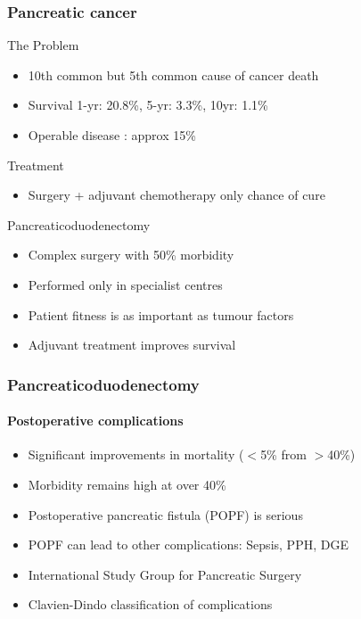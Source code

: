 \documentclass[10pt]{beamer}
\begin{document}
\begin{frame}
	\frametitle{Pancreatic cancer} %
	\begin{block}{The Problem}
		\begin{itemize}
			\item 10th common but 5th common cause of cancer death
			\item Survival	1-yr: 20.8\%, 5-yr: 3.3\%, 10yr: 1.1\%
			\item Operable disease : approx 15\%
		\end{itemize}
	\end{block}
	\begin{block}{Treatment}
		\begin{itemize}
			\item Surgery + adjuvant chemotherapy only chance of cure
		\end{itemize}
	\end{block}
	\begin{block}{Pancreaticoduodenectomy}
		\begin{itemize}
			\item Complex surgery with 50\% morbidity
			\item Performed only in specialist centres
			\item Patient fitness is as important as tumour factors
			\item Adjuvant treatment improves survival
		\end{itemize}
	\end{block}
\end{frame}

\begin{frame}
	\frametitle{Pancreaticoduodenectomy}
	\framesubtitle{Postoperative complications}
	\begin{itemize}
		\item Significant improvements in mortality ($<$5\% from $>$40\%)
		\item Morbidity remains high at over 40\%
		\item Postoperative pancreatic fistula (POPF) is serious
		\item POPF can lead to other complications: Sepsis, PPH, DGE
		\item International Study Group for Pancreatic Surgery
		\item Clavien-Dindo classification of complications
	\end{itemize}
\end{frame}
\end{document}
